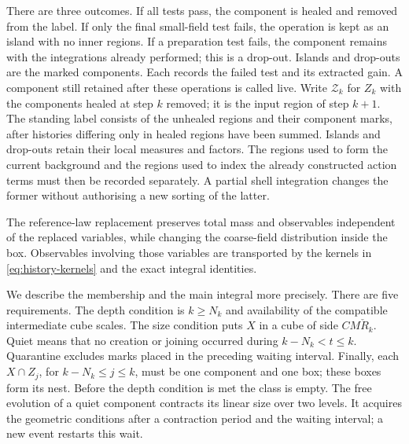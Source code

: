 \documentclass[11pt,letterpaper,reqno]{amsart}
\theoremstyle{definition}
\theoremstyle{remark}
\begin{document}
There are three outcomes. If all tests pass, the component is healed
and removed from the label. If only the final small-field test fails,
the operation is kept as an island with no inner regions. If a
preparation test fails, the component remains with the integrations
already performed; this is a drop-out. Islands and drop-outs are
the marked components. Each records the failed test and its extracted
gain. A component still retained after these operations is called
live. Write $\mathcal Z_k$ for $Z_k$ with the components healed
at step $k$ removed; it is the input region of step $k+1$.
The standing label consists of the unhealed regions and their
component marks, after histories differing only in healed regions
have been summed. Islands and drop-outs retain their local measures
and factors. The regions used to form the current background and
the regions used to index the already constructed action terms must
then be recorded separately. A partial shell integration changes the
former without authorising a new sorting of the latter.

The reference-law replacement preserves total mass and observables
independent of the replaced variables, while changing the coarse-field
distribution inside the box. Observables involving those variables are
transported by the kernels in \eqref{eq:history-kernels} and the exact
integral identities.

We describe the membership and the main integral more precisely.
There are five requirements. The depth condition is $k\ge N_k$
and availability of the compatible intermediate cube scales.
The size condition puts $X$ in a cube of side $CM\check R_k$.
Quiet means that no creation or joining occurred during
$k-N_k<t\le k$. Quarantine excludes marks placed in the
preceding waiting interval. Finally, each $X\cap Z_j$, for
$k-N_k\le j\le k$, must be one component and one box; these
boxes form its nest. Before the depth condition is met the
class is empty. The free evolution of a quiet component
contracts its linear size over two levels. It acquires the
geometric conditions after a contraction period and the
waiting interval; a new event restarts this wait.
\end{document}
